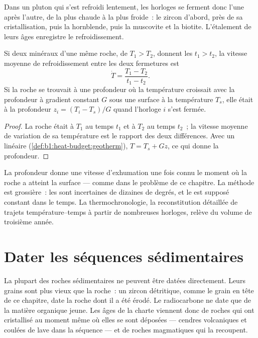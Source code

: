 Dans un pluton qui s'est refroidi lentement, les horloges se ferment donc l'une après l'autre,
de la plus chaude à la plus froide~: le zircon d'abord, près de sa cristallisation, puis
la hornblende, puis la muscovite et la biotite. L'étalement de leurs âges enregistre
le refroidissement.

\begin{proposition}\label{prop:b1:radiometric-methods:cooling}
Si deux minéraux d'une même roche, de  $T_1 > T_2$, donnent les 
$t_1 > t_2$, la vitesse moyenne de refroidissement entre les deux fermetures est
\[
  \dot T = \frac{T_1 - T_2}{t_1 - t_2}.
\]
Si la roche se trouvait à une profondeur où la température croissait avec la profondeur à gradient
constant $G$ sous une surface à la température $T_s$, elle était à la profondeur $z_i
= (T_i - T_s)/G$ quand l'horloge $i$ s'est fermée.
\end{proposition}

\begin{proof}
La roche était à $T_1$ au temps $t_1$ et à $T_2$ au temps $t_2$~; la vitesse moyenne
de variation de sa température est le rapport des deux différences. Avec un
 linéaire (\cref{def:b1:heat-budget:geotherm}), $T = T_s + G z$, ce qui
donne la profondeur.
\end{proof}

La profondeur donne une vitesse d'exhumation une fois connu le moment où la roche a atteint la surface
--- comme dans le problème de ce chapitre. La méthode est grossière~: les
 sont incertaines de dizaines de degrés, et le  est
supposé constant dans le temps. La thermochronologie, la reconstitution
détaillée de trajets température--temps à partir de nombreuses horloges, relève
du volume de troisième année.

\section{Dater les séquences sédimentaires}\label{sec:b1:radiometric-methods:sediments}

La plupart des roches sédimentaires ne peuvent être datées directement. Leurs grains sont plus vieux que
la roche~: un zircon détritique, comme le grain en tête de ce chapitre, date
la roche dont il a été érodé. Le radiocarbone ne date que de la matière organique jeune. Les âges
de la charte viennent donc de roches qui ont cristallisé au moment même où elles
se sont déposées --- cendres volcaniques et coulées de lave dans la séquence --- et de
roches magmatiques qui la recoupent.

